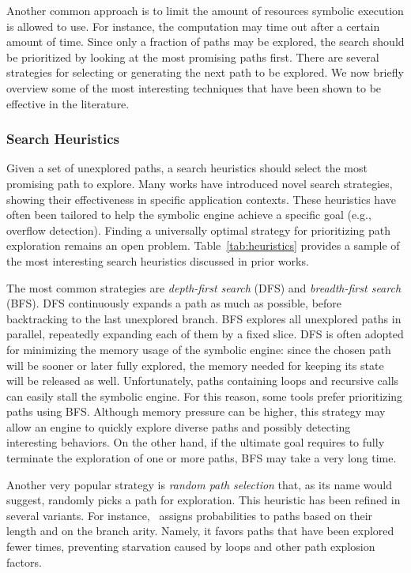 Another common approach is to limit the amount of resources symbolic execution is allowed to use. For instance, the computation may time out after a certain amount of time. Since only a fraction of paths may be explored, the search should be prioritized by looking at the most promising paths first. There are several strategies for selecting or generating the next path to be explored. We now briefly overview some of the most interesting techniques that have been shown to be effective in the literature. %

\subsubsection{Search Heuristics}
\label{sss:search-heuristics}

Given a set of unexplored paths, a search heuristics should select the most promising path to explore. Many works have introduced novel search strategies, showing their effectiveness in specific application contexts. These heuristics have often been tailored to help the symbolic engine achieve a specific goal (e.g., overflow detection). Finding a universally optimal strategy for prioritizing path exploration remains an open problem. Table~\ref{tab:heuristics} provides a sample of the most interesting search heuristics discussed in prior works. 

The most common strategies are {\em depth-first search} (DFS) and {\em breadth-first search} (BFS). DFS continuously expands a path as much as possible, before backtracking to the last unexplored branch. BFS explores all unexplored paths in parallel, repeatedly expanding each of them by a fixed slice. DFS is often adopted for minimizing the memory usage of the symbolic engine: since the chosen path will be sooner or later fully explored, the memory needed for keeping its state will be released as well. Unfortunately, paths containing loops and recursive calls can easily stall the symbolic engine. For this reason, some tools prefer prioritizing paths using BFS. Although memory pressure can be higher, this strategy may allow an engine to quickly explore diverse paths and possibly detecting interesting behaviors. On the other hand, if the ultimate goal requires to fully terminate the exploration of one or more paths, BFS may take a very long time.

Another very popular strategy is {\em random path selection} that, as its name would suggest, randomly picks a path for exploration. This heuristic has been refined in several variants. For instance,~\cite{KLEE-OSDI08} assigns probabilities to paths based on their length and on the branch arity. Namely, it favors paths that have been explored fewer times, preventing starvation caused by loops and other path explosion factors.

